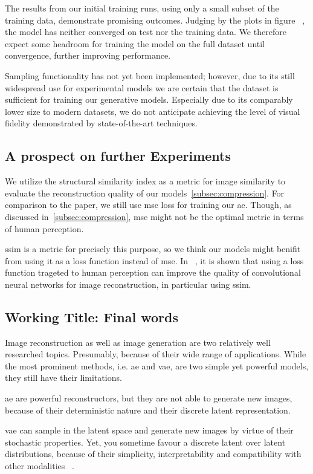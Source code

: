 The results from our initial training runs, using only a small subset of the training data, demonstrate promising
outcomes.
Judging by the plots in figure ~\cite{citationNeeded}, the model has neither converged on test nor the training data.
We therefore expect some headroom for training the model on the full dataset until convergence, further improving
performance.

Sampling functionality has not yet been implemented; however, due to its still widespread use for experimental
models we are certain that the dataset is sufficient for training our generative models.
Especially due to its comparably lower size to modern datasets, we do not anticipate achieving the level of visual
fidelity demonstrated by state-of-the-art techniques.

\subsection{A prospect on further Experiments}\label{subsec:further-ideas}
We utilize the structural similarity index as a metric for image similarity to evaluate the reconstruction quality
of our models~\ref{subsec:compression}.
For comparison to the paper, we still use \ac{mse} loss for training our \ac{ae}.
Though, as discussed in~\ref{subsec:compression}, \ac{mse} might not be the optimal metric in terms of human perception.

\ac{ssim} is a metric for precisely this purpose, so we think our models might benifit from using it as a loss
function instead of \ac{mse}.
In ~\cite{ssim_as_loss}, it is shown that using a loss function trageted to human perception can improve the quality
of convolutional neural networks for image reconstruction, in particular using \ac{ssim}.

\subsection{Working Title: Final words}\label{subsec:final-words}
Image reconstruction as well as image generation are two relatively well researched topics.
Presumably, because of their wide range of applications.
While the most prominent methods, i.e. \ac{ae} and \ac{vae}, are two simple yet powerful models, they still have
their limitations.

\ac{ae} are powerful reconstructors, but they are not able to generate new images, because of their deterministic
nature and their discrete latent representation.

\ac{vae} can sample in the latent space and generate new images by virtue of their stochastic properties.
Yet, you sometime favour a discrete latent over latent distributions, because of their simplicity, interpretability
and compatibility with other modalities ~\cite{vqvae}.

